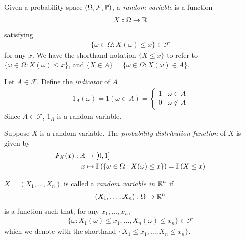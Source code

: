 \documentclass{../../template/note}
\begin{document}
    \begin{definition}
        \label{random-variables}
        Given a probability space \((\Omega, \mathcal F, \mathbb P)\), a \emph{random variable} is a function
        \begin{align*}
            X: \Omega \to \mathbb R
        \end{align*}
        satisfying
        \begin{align*}
            \{\omega \in \Omega : X(\omega) \leq x\} \in \mathcal F
        \end{align*}
        for any \(x\). We have the shorthand notation \(\{X \leq x\}\) to refer to \(\{\omega \in \Omega: X(\omega) \leq x\}\), and \(\{X \in A\} = \{\omega \in \Omega: X(\omega) \in A\}\).
    \end{definition}
    
    \begin{definition}
        Let \(A \in \mathcal F\). Define the \emph{indicator} of \(A\)
        \begin{align*}
            1_A(\omega) = 1(\omega \in A) = \begin{cases}
                1 & \omega \in A \\
                0 & \omega \notin A
            \end{cases}
        \end{align*}
        Since \(A \in \mathcal F\), \(1_A\) is a random variable.        
    \end{definition}

    \begin{definition}
        \label{probability-distribution-function}
        Suppose \(X\) is a random variable. The \emph{probability distribution function} of \(X\) is given by
        \begin{align*}
            F_X(x): \mathbb R &\to [0, 1] \\
            x &\mapsto \mathbb P(\{\omega \in \Omega: X(\omega) \leq x\}) = \mathbb P(X \leq x)
        \end{align*}
    \end{definition}
    
    \begin{definition}
        \(X = (X_1, \dots, X_n)\) is called a \emph{random variable in \(\mathbb R^n\)} if
        \begin{align*}
            (X_1, \dots, X_n): \Omega \to \mathbb R^n
        \end{align*}
        is a function such that, for any \(x_1, \dots, x_n\),
        \begin{align*}
            \{\omega: X_1(\omega) \leq x_1, \dots, X_n(\omega) \leq x_n\} \in \mathcal F
        \end{align*}
        which we denote with the shorthand \(\{X_1 \leq x_1, \dots, X_n \leq x_n\}\).
    \end{definition}
    
\end{document}
